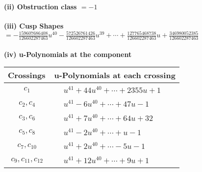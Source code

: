 \documentclass[1p]{elsarticle_modified}
\theoremstyle{definition}
\begin{document}
\flushleft \textbf{(ii) Obstruction class $= -1$}\\~\\
\flushleft \textbf{(iii) Cusp Shapes $= -\frac{159607686408}{126602287463} u^{40}-\frac{572526761426}{126602287463} u^{39}+\cdots+\frac{127765468738}{126602287463} u+\frac{346980052385}{126602287463}$}\\~\\
\newpage\renewcommand{\arraystretch}{1}
\flushleft \textbf{(iv) u-Polynomials at the component}\newline \\
\begin{tabular}{m{50pt}|m{274pt}}
Crossings & \hspace{64pt}u-Polynomials at each crossing \\
\hline $$\begin{aligned}c_{1}\end{aligned}$$&$\begin{aligned}
&u^{41}+44 u^{40}+\cdots+2355 u+1
\end{aligned}$\\
\hline $$\begin{aligned}c_{2},c_{4}\end{aligned}$$&$\begin{aligned}
&u^{41}-6 u^{40}+\cdots+47 u-1
\end{aligned}$\\
\hline $$\begin{aligned}c_{3},c_{6}\end{aligned}$$&$\begin{aligned}
&u^{41}+7 u^{40}+\cdots+64 u+32
\end{aligned}$\\
\hline $$\begin{aligned}c_{5},c_{8}\end{aligned}$$&$\begin{aligned}
&u^{41}-2 u^{40}+\cdots+u-1
\end{aligned}$\\
\hline $$\begin{aligned}c_{7},c_{10}\end{aligned}$$&$\begin{aligned}
&u^{41}+2 u^{40}+\cdots-5 u-1
\end{aligned}$\\
\hline $$\begin{aligned}c_{9},c_{11},c_{12}\end{aligned}$$&$\begin{aligned}
&u^{41}+12 u^{40}+\cdots+9 u+1
\end{aligned}$\\
\hline
\end{tabular}\\~\\
\end{document}
